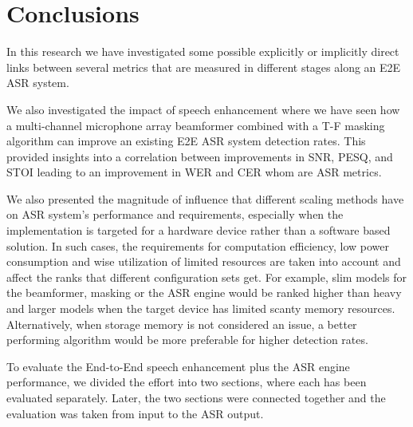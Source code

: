 \chapter{Conclusions}\label{ch:concl_ch}
\vspace{-1cm}
In this research we have 
investigated some possible 
explicitly or implicitly direct links
between
several metrics that are measured 
in different stages along an E2E ASR system.

\bigskip

We also investigated the 
impact of speech enhancement 
where we have seen how
a multi-channel microphone array beamformer
combined with a T-F masking algorithm
can improve an existing E2E ASR system detection rates.
This provided insights into a correlation 
between improvements in SNR, PESQ, and STOI
leading 
to an improvement in WER and CER whom
are ASR metrics.

\bigskip

We also presented
the magnitude of influence
that different scaling methods have 
on ASR system's performance and requirements,
especially when the implementation is targeted for
a hardware device rather than a software based solution.
In such cases, the requirements for
computation efficiency, low power consumption
and wise utilization of limited resources
are taken into account and affect the 
ranks that different configuration sets
get. For example, slim models for the
beamformer, masking or the ASR engine 
would be ranked higher than heavy and 
larger models
when the target device has limited
scanty memory resources. 
Alternatively, when storage memory is
not considered an issue, a better performing
algorithm would be more preferable
for higher detection rates.

\bigskip

To evaluate the End-to-End speech enhancement
plus the ASR engine performance, we divided
the effort into two sections, where each has been
evaluated separately. Later, the two sections 
were connected together and the evaluation was
taken from input to the ASR output.

\bigskip

